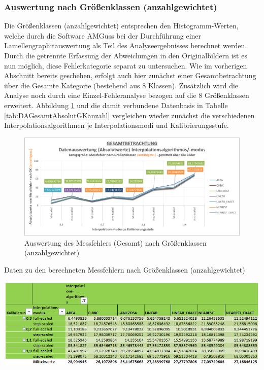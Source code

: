 \documentclass[
fontsize=10pt, 
listof = totoc,
parskip = half	
]{report}
\begin{document}
\subsubsection{Auswertung nach Größenklassen (anzahlgewichtet)}
\label{subsubsec:AuswertungGKanz}
Die Größenklassen (anzahlgewichtet) entsprechen den Histogramm-Werten, welche durch die Software AMGuss bei der Durchführung einer Lamellengraphitauswertung als Teil des Analyseergebnisses berechnet werden. Durch die getrennte Erfassung der Abweichungen in den Originalbildern ist es nun möglich, diese Fehlerkategorie separat zu untersuchen. Wie im vorherigen Abschnitt bereits geschehen, erfolgt auch hier zunächst einer Gesamtbetrachtung über die Gesamte Kategorie (bestehend aus 8 Klassen). Zusätzlich wird die Analyse noch durch eine Einzel-Fehleranalyse bezogen auf die 8 Größenklassen erweitert. Abbildung \ref{fig:DAGesamtAbsolutGKanzahl} und die damit verbundene Datenbasis in Tabelle \ref{tab:DAGesamtAbsolutGKanzahl} vergleichen wieder zunächst die verschiedenen Interpolationsalgorithmen je Interpolationsmodi und Kalibrierungsstufe.

\begin{figure}[H]
	\centering
	\includegraphics[width=\textwidth, height=\textheight, keepaspectratio]{pics/DA_Gesamt_Absolut_GKanzahl}
	\caption{Auswertung des Messfehlers (Gesamt) nach Größenklassen (anzahlgewichtet)}
	\label{fig:DAGesamtAbsolutGKanzahl}
\end{figure}

\begin{table}[H]
	\centering
	\caption{Daten zu den berechneten Messfehlern nach Größenklassen (anzahlgewichtet)}
	\label{tab:DAGesamtAbsolutGKanzahl}
	\includegraphics[width=\textwidth, height=\textheight, keepaspectratio]{pics/Tab_DA_Gesamt_Absolut_GKanzahl}
\end{table}
\end{document}
